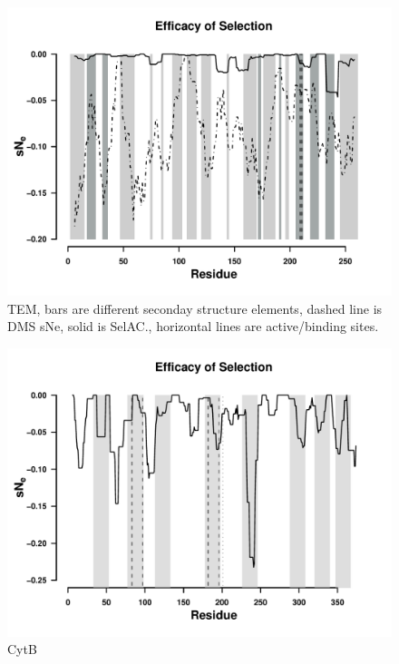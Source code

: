 \documentclass[12pt]{article}
\begin{document}
\begin{figure}[H]
     \centering
	\includegraphics[width=\textwidth]{img/sNe_slide_TEM2016}
	\caption{TEM, bars are different seconday structure elements, dashed line is DMS sNe, solid is SelAC., horizontal lines are active/binding sites.}
	\label{fig:tem2016_sse}
\end{figure}

\begin{figure}[H]
     \centering
	\includegraphics[width=\textwidth]{img/sNe_slide_whale}
	\caption{CytB}
	\label{fig:whale_sse}
\end{figure}
\end{document}
